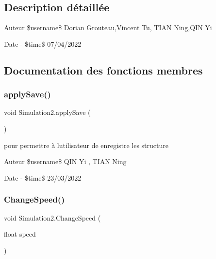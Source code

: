 \subsection{Description détaillée}
\begin{DoxyAuthor}{Auteur}
\$username\$ Dorian Grouteau,Vincent Tu, T\+I\+AN Ning,Q\+IN Yi 
\end{DoxyAuthor}
\begin{DoxyDate}{Date}
-\/ \$time\$ 07/04/2022 
\end{DoxyDate}


\subsection{Documentation des fonctions membres}
\mbox{\label{class_simulation2_a5a15f114f03b61aec33f641c49e0734c}} 
\subsubsection{\texorpdfstring{apply\+Save()}{applySave()}}
{\footnotesize\ttfamily void Simulation2.\+apply\+Save (\begin{DoxyParamCaption}{ }\end{DoxyParamCaption})\hspace{0.3cm}{\ttfamily [inline]}}



pour permettre à l\textquotesingle{}utilisateur de enregistre les structure 

\begin{DoxyAuthor}{Auteur}
\$username\$ Q\+IN Yi , T\+I\+AN Ning 
\end{DoxyAuthor}
\begin{DoxyDate}{Date}
-\/ \$time\$ 23/03/2022 
\end{DoxyDate}
\mbox{\label{class_simulation2_ad962236b5b5316310e2db253a6ffecee}} 
\subsubsection{\texorpdfstring{Change\+Speed()}{ChangeSpeed()}}
{\footnotesize\ttfamily void Simulation2.\+Change\+Speed (\begin{DoxyParamCaption}\item[{float}]{speed }\end{DoxyParamCaption})\hspace{0.3cm}{\ttfamily [inline]}}



